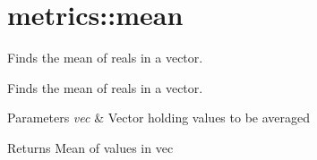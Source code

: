 \hypertarget{group__mean}{}\section{metrics\+:\+:mean}
\label{group__mean}


Finds the mean of reals in a vector.  


Finds the mean of reals in a vector. 


\begin{DoxyParams}{Parameters}
{\em vec} & Vector holding values to be averaged \\
\hline
\end{DoxyParams}
\begin{DoxyReturn}{Returns}
Mean of values in vec 
\end{DoxyReturn}
